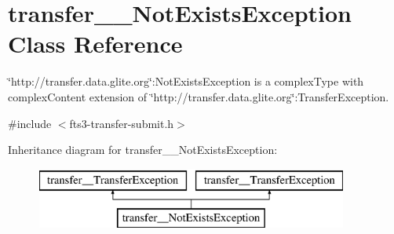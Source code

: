 \section{transfer\_\-\_\-NotExistsException Class Reference}
\label{classtransfer____NotExistsException}


\char`\"{}http://transfer.data.glite.org\char`\"{}:NotExistsException is a complexType with complexContent extension of \char`\"{}http://transfer.data.glite.org\char`\"{}:TransferException.  




{\ttfamily \#include $<$fts3-\/transfer-\/submit.h$>$}

Inheritance diagram for transfer\_\-\_\-NotExistsException:\begin{figure}[H]
\begin{center}
\leavevmode
\includegraphics[height=2.000000cm]{classtransfer____NotExistsException}
\end{center}
\end{figure}
